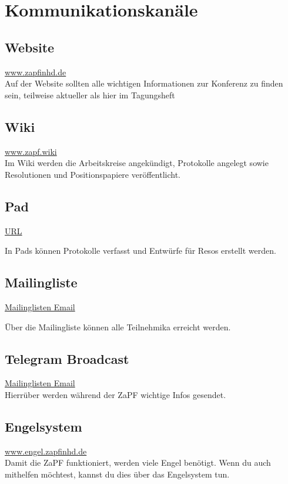 
\section{Kommunikationskanäle}

\subsection{Website}
\url{www.zapfinhd.de}\\

\noindent Auf der Website sollten alle wichtigen Informationen zur Konferenz zu finden sein, teilweise aktueller als hier im Tagungsheft

\subsection{Wiki}
\url{www.zapf.wiki}\\

\noindent Im Wiki werden die Arbeitskreise angekündigt, Protokolle angelegt sowie Resolutionen und Positionspapiere veröffentlicht.

\subsection{Pad}
\url{URL}\\ 

\noindent In Pads können Protokolle verfasst und Entwürfe für Resos erstellt werden.

\subsection{Mailingliste}
\url{Mailinglisten Email}\\ 

\noindent Über die Mailingliste können alle Teilnehmika erreicht werden.

\subsection{Telegram Broadcast}
\url{Mailinglisten Email} \\

\noindent Hierrüber werden während der ZaPF wichtige Infos gesendet.

\subsection{Engelsystem}
\url{www.engel.zapfinhd.de}\\

\noindent Damit die ZaPF funktioniert, werden viele Engel benötigt. Wenn du auch mithelfen möchtest, kannst du dies über das Engelsystem tun.